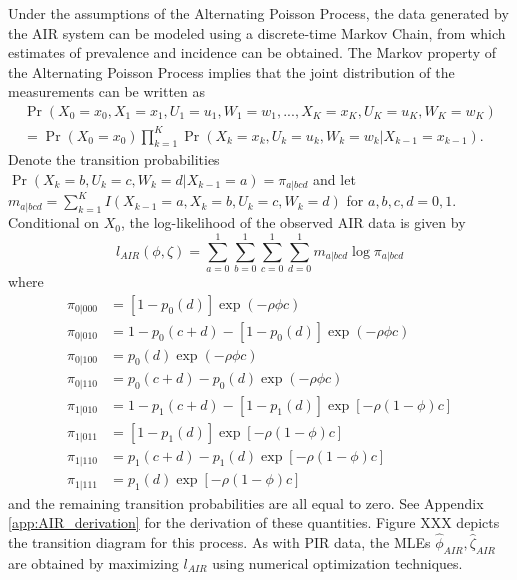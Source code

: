 \documentclass[man, noextraspace, floatsintext]{apa6}\usepackage[]{graphicx}\usepackage[]{color}
\begin{document}
Under the assumptions of the Alternating Poisson Process, the data generated by the AIR system can be modeled using a discrete-time Markov Chain, from which estimates of prevalence and incidence can be obtained. 
The Markov property of the Alternating Poisson Process implies that the joint distribution of the measurements can be written as
\begin{multline}
\Pr\left(X_0=x_0,X_1=x_1,U_1 = u_1, W_1 = w_1,..., X_K=x_K, U_K = u_K, W_K = w_K \right) \\ = \Pr\left(X_0 = x_0\right) \prod_{k=1}^{K} \Pr\left(X_k = x_k, U_k = u_k, W_k = w_k | X_{k-1} = x_{k-1}\right). 
\end{multline}
Denote the transition probabilities $\Pr\left(X_k = b, U_k = c, W_k = d | X_{k-1} = a\right) = \pi_{a|bcd}$ and let $m_{a|bcd} = \sum_{k=1}^{K} I\left(X_{k-1} = a, X_k = b, U_k = c, W_k = d \right)$ for $a,b,c,d = 0,1$. 
Conditional on $X_0$, the log-likelihood of the observed AIR data is given by
\begin{equation}
\label{eq:AIR_loglik}
l_{AIR}\left(\phi,\zeta\right) = \sum_{a=0}^1 \sum_{b=0}^1 \sum_{c=0}^1 \sum_{d=0}^1 m_{a|bcd} \log \pi_{a|bcd}
\end{equation}
where
\begin{align*}
\pi_{0|000} &= \left[1 - p_0(d)\right]\exp\left(-\rho\phi c\right) \\
\pi_{0|010} &= 1 - p_0(c + d) - \left[1 - p_0(d)\right]\exp\left(-\rho\phi c\right) \\
\pi_{0|100} &= p_0(d)\exp\left(-\rho\phi c\right) \\
\pi_{0|110} &= p_0(c + d) - p_0(d) \exp\left(-\rho\phi c\right) \\
\pi_{1|010} &= 1 - p_1(c + d) - \left[1 - p_1(d)\right]\exp\left[-\rho(1 - \phi) c\right] \\
\pi_{1|011} &= \left[1 - p_1(d)\right]\exp\left[-\rho(1 - \phi) c\right] \\
\pi_{1|110} &= p_1(c + d) - p_1(d) \exp\left[-\rho(1 - \phi) c\right] \\
\pi_{1|111} &= p_1(d)\exp\left[-\rho(1 - \phi) c\right]
\end{align*}
and the remaining transition probabilities are all equal to zero. 
See Appendix \ref{app:AIR_derivation} for the derivation of these quantities. 
Figure XXX depicts the transition diagram for this process.
As with PIR data, the MLEs $\hat\phi_{AIR}, \hat\zeta_{AIR}$ are obtained by maximizing $l_{AIR}$ using numerical optimization techniques. 
\end{document}
